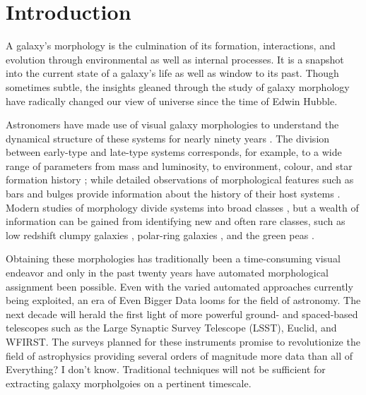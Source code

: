 
\chapter{Introduction}
\label{chap:intro}


A galaxy's morphology is the culmination of its formation, interactions, and evolution through environmental as well as internal processes. It is a snapshot into the current state of a galaxy's life as well as window to its past. Though sometimes subtle, the insights gleaned through the study of galaxy morphology have radically changed our view of universe since the time of Edwin Hubble. 


Astronomers have made use of visual galaxy morphologies to understand the dynamical structure of these systems for nearly ninety years 
\citep[e.g.,][]{Hubble1936, 
			deVauc1959, 
			Sandage1961, 
			vandenBergh1976, 
			NairAbraham2010, 
			Baillard2011}. 
The division between early-type and late-type systems corresponds, for example, to a wide range of parameters from mass and luminosity, to environment, colour, and star formation history 
\citep[e.g.,][]{Kormendy1977,  
			Dressler1980, 
			Strateva2001, 
			Blanton2003, 
			Kauffman2003, 
			Nakamura2003, 
			Shen2003, 
			Peng2010}; 
while detailed observations of morphological features such as bars and bulges provide information about the history of their host systems 
\citep[e.g., review by][]{KK04, 
			Elmegreen2008, 
			Sheth2008, 
			Masters2010, 
			Simmons2014}. 
Modern studies of morphology  divide systems into broad classes 
\citep[e.g.,][]{Conselice2006, 
			Lintott2008, 
			Kartaltepe2015, 
			Peth2016}, 
but a wealth of information can be gained from identifying new and often rare classes, such as low redshift clumpy galaxies \citep[e.g.,][]{Elmegreen2013}, polar-ring galaxies \citep[e.g.,][]{Whitmore1990}, and the green peas \citep{Cardamone2009}. 

Obtaining these morphologies has traditionally been a time-consuming visual endeavor and only in the past twenty years have automated morphological assignment been possible. Even with the varied automated approaches currently being exploited, an era of Even Bigger Data looms for the field of astronomy. The next decade will herald the first light of more powerful ground- and spaced-based telescopes such as the Large Synaptic Survey Telescope (LSST), Euclid, and WFIRST. The surveys planned for these instruments promise to revolutionize the field of astrophysics providing several orders of magnitude more data than all of Everything? I don't know. Traditional techniques will not be sufficient for extracting galaxy morpholgoies on a pertinent timescale. 


